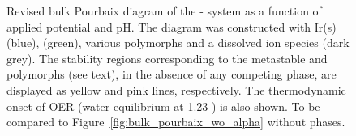 \begin{figure}[!htb]
\centering
{}
\caption{\label{fig:bulk_pourbaix}
%
Revised bulk Pourbaix diagram of the - system as a function of applied potential and pH.
%
The diagram was constructed with Ir(s) (blue), \rIrOtwo (green), various \IrOthree polymorphs and a dissolved  ion species (dark grey).
%
The stability regions corresponding to the metastable \rIrOthree and \bIrOthree polymorphs (see text), in the absence of any competing \IrOthree phase, are displayed as yellow and pink lines, respectively.
%
The thermodynamic onset of OER (water equilibrium at \num{1.23} \VRHE) is also shown.
%
To be compared to Figure~\ref{fig:bulk_pourbaix_wo_alpha} without \IrOthree phases.
%
%
}
\end{figure}


